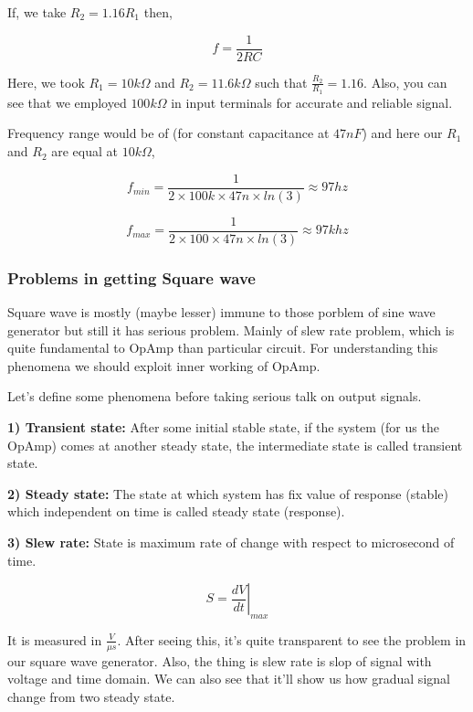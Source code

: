\documentclass[14pt,a4paper]{extarticle}
\begin{document}
If, we take \(R_{2}=1.16R_{1}\) then, 

\begin{equation}
\label{eq:orgfe0486d}
  f =\frac{1}{2RC}
\end{equation}

Here, we took \(R_{1} = 10k\Omega\) and \(R_{2} = 11.6k\Omega\) such that \(\frac{R_{2}}{R_{1}}=1.16\). Also, you can see that we employed \(100k\Omega\) in input terminals for accurate and reliable signal.




Frequency range would be of (for constant capacitance at \(47nF\)) and here our \(R_1\) and \(R_2\) are equal at \(10k\Omega\),

\begin{equation*}
\label{eq:org53e196d}
  f_{min} =\frac{1}{2\times 100k\times 47n \times ln(3)} \approx 97 hz
\end{equation*}

\begin{equation*}
\label{eq:org59a9bfa}
  f_{max} =\frac{1}{2\times 100 \times 47n \times ln(3)} \approx 97 khz
\end{equation*}


\subsubsection{Problems in getting Square wave}
\label{sec:orgf30ebeb}

Square wave is mostly (maybe lesser) immune to those porblem of sine wave generator but still it has serious problem. Mainly of slew rate problem, which is quite fundamental to OpAmp than particular circuit. For understanding this phenomena  we should exploit inner working of OpAmp. 

Let's define some phenomena before taking serious talk on output signals.


\textbf{\textbf{1) Transient state:}} After some initial stable state, if the system (for us the OpAmp) comes at another steady state, the intermediate state is called transient state.

\textbf{\textbf{2) Steady state:}} The state at which system has fix value of response (stable) which independent on time is called steady state (response).

\textbf{\textbf{3) Slew rate:}} State is maximum rate of change with respect to microsecond of time. 

$$ S = \left.\frac{dV}{dt}\right|_{max}$$

It is measured in \(\frac{V}{\mu s}\). After seeing this, it's quite transparent to see the problem in our square wave generator. Also, the thing is slew rate is slop of signal with voltage and time domain. We can also see that it'll show us how gradual signal change from two steady state.
\end{document}
